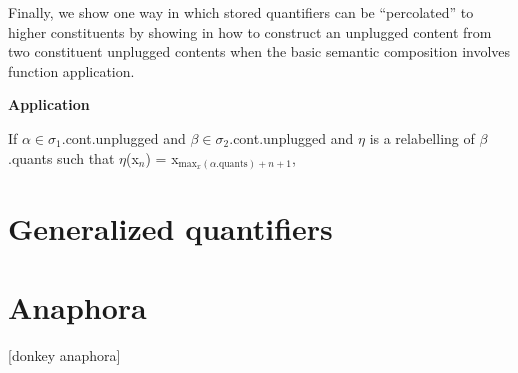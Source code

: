Finally, we show one way in which stored quantifiers can be
``percolated'' to higher constituents by showing in \nexteg{} how to
construct an unplugged content from two constituent unplugged contents
when the basic semantic composition involves function application.
\begin{ex} 
\textbf{Application}

If $\alpha\in\sigma_1$.cont.unplugged and
$\beta\in\sigma_2$.cont.unplugged and $\eta$ is a relabelling of
$\beta$.quants such that $\eta$(x$_n$) = x$_{\mathrm{max}_x(\alpha.\mathrm{quants})+n+1}$, 
\end{ex} 
  
   



\section{Generalized quantifiers}



\section{Anaphora}

[donkey anaphora]

